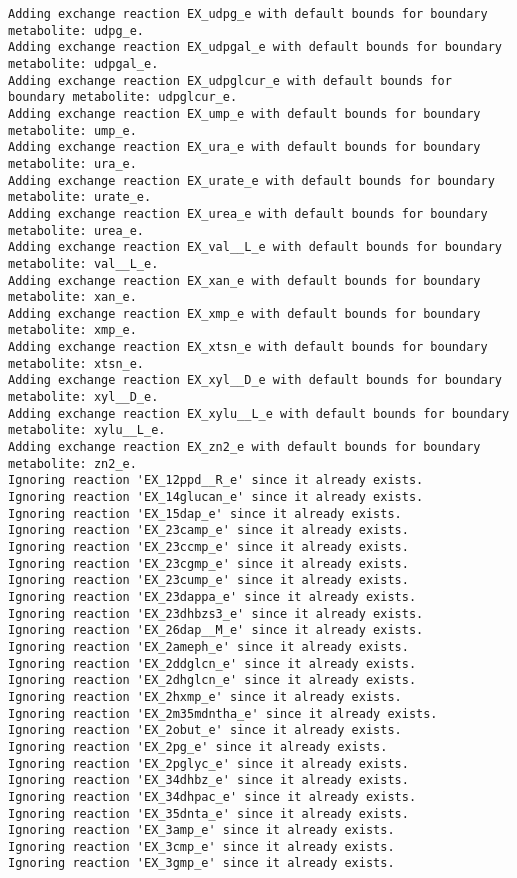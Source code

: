 \documentclass[
  letterpaper,
  DIV=11,
  numbers=noendperiod]{scrartcl}
\begin{document}
\begin{verbatim}
Adding exchange reaction EX_udpg_e with default bounds for boundary metabolite: udpg_e.
Adding exchange reaction EX_udpgal_e with default bounds for boundary metabolite: udpgal_e.
Adding exchange reaction EX_udpglcur_e with default bounds for boundary metabolite: udpglcur_e.
Adding exchange reaction EX_ump_e with default bounds for boundary metabolite: ump_e.
Adding exchange reaction EX_ura_e with default bounds for boundary metabolite: ura_e.
Adding exchange reaction EX_urate_e with default bounds for boundary metabolite: urate_e.
Adding exchange reaction EX_urea_e with default bounds for boundary metabolite: urea_e.
Adding exchange reaction EX_val__L_e with default bounds for boundary metabolite: val__L_e.
Adding exchange reaction EX_xan_e with default bounds for boundary metabolite: xan_e.
Adding exchange reaction EX_xmp_e with default bounds for boundary metabolite: xmp_e.
Adding exchange reaction EX_xtsn_e with default bounds for boundary metabolite: xtsn_e.
Adding exchange reaction EX_xyl__D_e with default bounds for boundary metabolite: xyl__D_e.
Adding exchange reaction EX_xylu__L_e with default bounds for boundary metabolite: xylu__L_e.
Adding exchange reaction EX_zn2_e with default bounds for boundary metabolite: zn2_e.
Ignoring reaction 'EX_12ppd__R_e' since it already exists.
Ignoring reaction 'EX_14glucan_e' since it already exists.
Ignoring reaction 'EX_15dap_e' since it already exists.
Ignoring reaction 'EX_23camp_e' since it already exists.
Ignoring reaction 'EX_23ccmp_e' since it already exists.
Ignoring reaction 'EX_23cgmp_e' since it already exists.
Ignoring reaction 'EX_23cump_e' since it already exists.
Ignoring reaction 'EX_23dappa_e' since it already exists.
Ignoring reaction 'EX_23dhbzs3_e' since it already exists.
Ignoring reaction 'EX_26dap__M_e' since it already exists.
Ignoring reaction 'EX_2ameph_e' since it already exists.
Ignoring reaction 'EX_2ddglcn_e' since it already exists.
Ignoring reaction 'EX_2dhglcn_e' since it already exists.
Ignoring reaction 'EX_2hxmp_e' since it already exists.
Ignoring reaction 'EX_2m35mdntha_e' since it already exists.
Ignoring reaction 'EX_2obut_e' since it already exists.
Ignoring reaction 'EX_2pg_e' since it already exists.
Ignoring reaction 'EX_2pglyc_e' since it already exists.
Ignoring reaction 'EX_34dhbz_e' since it already exists.
Ignoring reaction 'EX_34dhpac_e' since it already exists.
Ignoring reaction 'EX_35dnta_e' since it already exists.
Ignoring reaction 'EX_3amp_e' since it already exists.
Ignoring reaction 'EX_3cmp_e' since it already exists.
Ignoring reaction 'EX_3gmp_e' since it already exists.

\end{verbatim}
\end{document}
